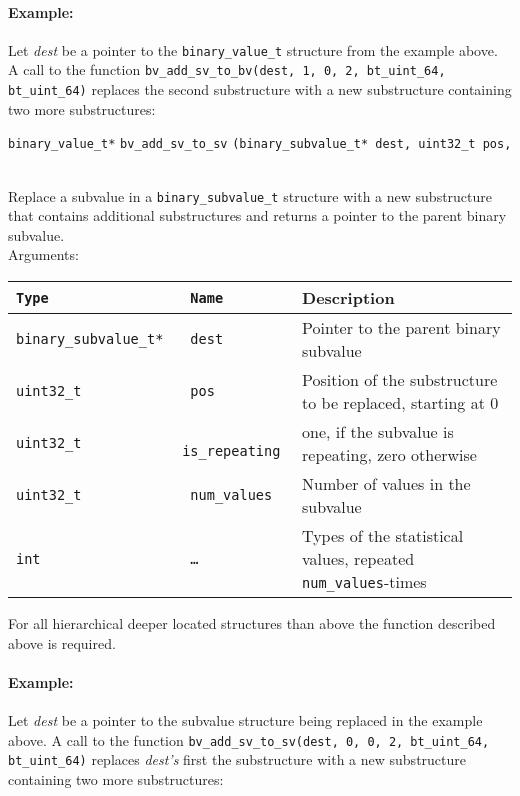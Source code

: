 \documentclass[documentation]{subfiles}
\begin{document}
\paragraph{Example:}
Let {\em dest} be a pointer to the {\tt binary\_value\_t} structure from the example above. A call to the function {\tt bv\_add\_sv\_to\_bv(dest, 1, 0, 2, bt\_uint\_64, bt\_uint\_64)} replaces the second substructure with a new substructure containing two more substructures:
\begin{figure}[H]
    \centering
\end{figure}

\vspace{18pt}

\begin{tabbing}
\={\tt binary\_value\_t*} \={\tt bv\_add\_sv\_to\_sv} \={\tt(binary\_subvalue\_t* dest, uint32\_t pos,} \\
\>\> \\
\end{tabbing}
\indent Replace a subvalue in a {\tt binary\_subvalue\_t} structure with a new substructure that contains additional substructures and returns a pointer to the parent binary subvalue.\\[2ex]
Arguments:
\begin{longtable}{>{\tt}l>{\tt}ll}
    \toprule
    {\bf Type}           & {\bf Name}    & {\bf Description} \\
    \midrule\endhead%
    binary\_subvalue\_t* & dest          & Pointer to the parent binary subvalue \\
    uint32\_t            & pos           & Position of the substructure to be replaced, starting at 0 \\
    uint32\_t            & is\_repeating & one, if the subvalue is repeating, zero otherwise \\
    uint32\_t            & num\_values   & Number of values in the subvalue \\
    int                  & \ldots        & Types of the statistical values, repeated {\tt num\_values}-times \\
    \bottomrule
\end{longtable}

For all hierarchical deeper located structures than above the function described above is required.

\paragraph{Example:}
Let {\em dest} be a pointer to the subvalue structure being replaced in the example above. A call to the function {\tt bv\_add\_sv\_to\_sv(dest, 0, 0, 2, bt\_uint\_64, bt\_uint\_64)} replaces {\em dest's} first the substructure with a new substructure containing two more substructures:
\begin{figure}[H]
    \centering
\end{figure}
\end{document}
